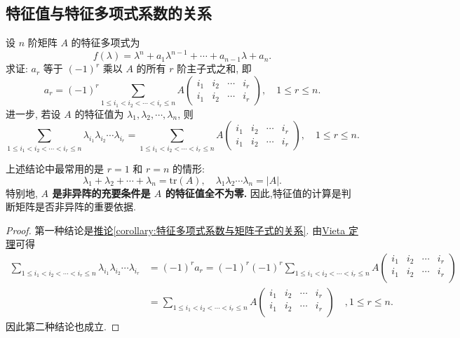\documentclass[../../main.tex]{subfiles}
\begin{document}
\subsection{特征值与特征多项式系数的关系}

\begin{proposition}[特征值与特征多项式系数的关系]\label{proposition:特征值与特征多项式系数的关系}
设 $n$ 阶矩阵 $A$ 的特征多项式为
\[
f(\lambda) = \lambda^n + a_1 \lambda^{n-1} + \cdots + a_{n-1} \lambda + a_n.
\]
求证: $a_r$ 等于 $(-1)^r$ 乘以 $A$ 的所有 $r$ 阶主子式之和, 即
\[
a_r = (-1)^r \sum_{1 \leqslant  i_1 < i_2 < \cdots < i_r \leqslant  n}  A
\begin{pmatrix}
i_1 & i_2 & \cdots & i_r \\
i_1 & i_2 & \cdots & i_r
\end{pmatrix}, \quad 1 \leqslant  r \leqslant  n.
\]
进一步, 若设 $A$ 的特征值为 $\lambda_1, \lambda_2, \cdots, \lambda_n$, 则
\[
\sum_{1 \leqslant  i_1 < i_2 < \cdots < i_r \leqslant  n} \lambda_{i_1} \lambda_{i_2} \cdots \lambda_{i_r} = \sum_{1 \leqslant  i_1 < i_2 < \cdots < i_r \leqslant  n} A
\begin{pmatrix}
i_1 & i_2 & \cdots & i_r \\
i_1 & i_2 & \cdots & i_r
\end{pmatrix}, \quad 1 \leqslant  r \leqslant  n.
\]
\end{proposition}
\begin{remark}
上述结论中最常用的是 $r = 1$ 和 $r = n$ 的情形:
\[
\lambda_1 + \lambda_2 + \cdots + \lambda_n = \mathrm{tr}(A), \quad \lambda_1 \lambda_2 \cdots \lambda_n = |A|.
\]
特别地,\textbf{ $A$ 是非异阵的充要条件是 $A$ 的特征值全不为零.} 因此,特征值的计算是判断矩阵是否非异阵的重要依据.
\end{remark}
\begin{proof}
第一种结论是\hyperref[corollary:特征多项式系数与矩阵子式的关系]{推论\ref{corollary:特征多项式系数与矩阵子式的关系}}. 
由\hyperref[theorem:Vieta定理]{Vieta 定理}可得
\begin{align*}
\sum_{1\le i_1<i_2<\cdots <i_r\le n}{\lambda _{i_1}\lambda _{i_2}}\cdots \lambda _{i_r}&=\left( -1 \right) ^ra_r=\left( -1 \right) ^r\left( -1 \right) ^r\sum_{1\le i_1<i_2<\cdots <i_r\le n}{A\left( \begin{matrix}
i_1&		i_2&		\cdots&		i_r\\
i_1&		i_2&		\cdots&		i_r\\
\end{matrix} \right)}
\\
&=\sum_{1\le i_1<i_2<\cdots <i_r\le n}{A\left( \begin{matrix}
i_1&		i_2&		\cdots&		i_r\\
i_1&		i_2&		\cdots&		i_r\\
\end{matrix} \right)}\quad ,1\le r\le n.
\end{align*}
因此第二种结论也成立.

\end{proof}
\end{document}
